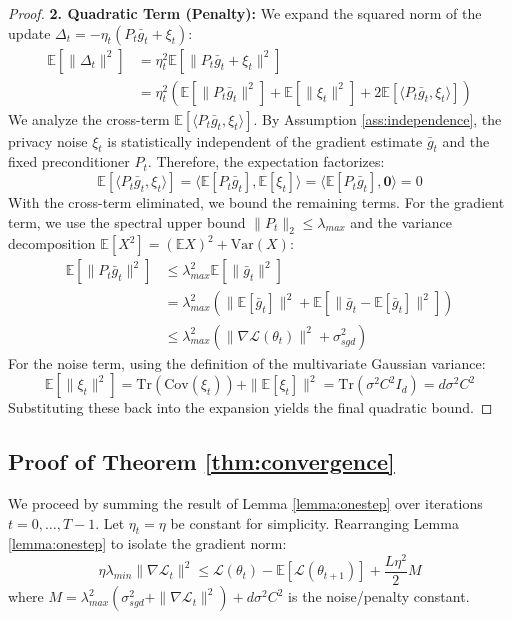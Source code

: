 \documentclass{article}
\theoremstyle{plain}
\theoremstyle{definition}
\theoremstyle{remark}
\begin{document}
\begin{proof}
\textbf{2. Quadratic Term (Penalty):}
We expand the squared norm of the update $\Delta_t = -\eta_t (P_t \bar{g}_t + \xi_t)$:
\begin{align}
    \mathbb{E}[\|\Delta_t\|^2] &= \eta_t^2 \mathbb{E}\left[ \|P_t \bar{g}_t + \xi_t\|^2 \right] \\
    &= \eta_t^2 \left( \mathbb{E}[\|P_t \bar{g}_t\|^2] + \mathbb{E}[\|\xi_t\|^2] + 2\mathbb{E}[\langle P_t \bar{g}_t, \xi_t \rangle] \right)
\end{align}
We analyze the cross-term $\mathbb{E}[\langle P_t \bar{g}_t, \xi_t \rangle]$. By Assumption \ref{ass:independence}, the privacy noise $\xi_t$ is statistically independent of the gradient estimate $\bar{g}_t$ and the fixed preconditioner $P_t$. Therefore, the expectation factorizes:
\begin{equation}
    \mathbb{E}[\langle P_t \bar{g}_t, \xi_t \rangle] = \langle \mathbb{E}[P_t \bar{g}_t], \mathbb{E}[\xi_t] \rangle = \langle \mathbb{E}[P_t \bar{g}_t], \mathbf{0} \rangle = 0
\end{equation}
With the cross-term eliminated, we bound the remaining terms.
For the gradient term, we use the spectral upper bound $\|P_t\|_2 \le \lambda_{max}$ and the variance decomposition $\mathbb{E}[X^2] = (\mathbb{E}X)^2 + \text{Var}(X)$:
\begin{align}
    \mathbb{E}[\|P_t \bar{g}_t\|^2] &\le \lambda_{max}^2 \mathbb{E}[\|\bar{g}_t\|^2] \\
    &= \lambda_{max}^2 \left( \|\mathbb{E}[\bar{g}_t]\|^2 + \mathbb{E}[\|\bar{g}_t - \mathbb{E}[\bar{g}_t]\|^2] \right) \\
    &\le \lambda_{max}^2 \left( \|\nabla \mathcal{L}(\theta_t)\|^2 + \sigma_{sgd}^2 \right)
\end{align}
For the noise term, using the definition of the multivariate Gaussian variance:
\begin{equation}
    \mathbb{E}[\|\xi_t\|^2] = \text{Tr}(\text{Cov}(\xi_t)) + \|\mathbb{E}[\xi_t]\|^2 = \text{Tr}(\sigma^2 C^2 I_d) = d \sigma^2 C^2
\end{equation}
Substituting these back into the expansion yields the final quadratic bound.

\end{proof}

\subsection{Proof of Theorem \ref{thm:convergence}}

We proceed by summing the result of Lemma \ref{lemma:onestep} over iterations $t = 0, \dots, T-1$. Let $\eta_t = \eta$ be constant for simplicity. Rearranging Lemma \ref{lemma:onestep} to isolate the gradient norm:
\begin{equation}
    \eta \lambda_{min} \|\nabla \mathcal{L}_t\|^2 \le \mathcal{L}(\theta_t) - \mathbb{E}[\mathcal{L}(\theta_{t+1})] + \frac{L \eta^2}{2} M
\end{equation}
where $M = \lambda_{max}^2 (\sigma_{sgd}^2 + \|\nabla \mathcal{L}_t\|^2) + d \sigma^2 C^2$ is the noise/penalty constant.
\end{document}
